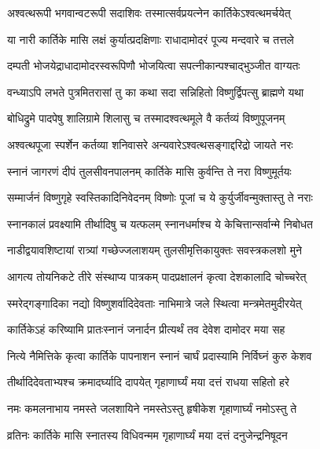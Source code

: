 \twolineshloka
{अश्वत्थरूपी भगवान्वटरूपी सदाशिवः}
{तस्मात्सर्वप्रयत्नेन कार्तिकेऽश्वत्थमर्चयेत्} %

\twolineshloka
{या नारी कार्तिके मासि लक्षं कुर्यात्प्रदक्षिणाः}
{राधादामोदरं पूज्य मन्दवारे च तत्तले} %

\twolineshloka
{दम्पती भोजयेद्राधादामोदरस्वरूपिणौ}
{भोजयित्वा सपत्नीकान्पश्चाद्भुञ्जीत वाग्यतः} %

\twolineshloka
{वन्ध्याऽपि लभते पुत्रमितरासां तु का कथा}
{सदा सन्निहितो विष्णुर्द्विपत्सु ब्राह्मणे यथा} %

\twolineshloka
{बोधिद्रुमे पादपेषु शालिग्रामे शिलासु च}
{तस्मादश्वत्थमूले वै कर्तव्यं विष्णुपूजनम्} %

\twolineshloka
{अश्वत्थपूजा स्पर्शेन कर्तव्या शनिवासरे}
{अन्यवारेऽश्वत्थसङ्गाद्दरिद्रो जायते नरः} %

\twolineshloka
{स्नानं जागरणं दीपं तुलसीवनपालनम्}
{कार्तिके मासि कुर्वन्ति ते नरा विष्णुमूर्तयः} %

\twolineshloka
{सम्मार्जनं विष्णुगृहे स्वस्तिकादिनिवेदनम्}
{विष्णोः पूजां च ये कुर्युर्जीवन्मुक्तास्तु ते नराः} %

\twolineshloka
{स्नानकालं प्रवक्ष्यामि तीर्थादिषु च यत्फलम्}
{स्नानधर्माश्च ये केचित्तान्सर्वान्मे निबोधत} %






\twolineshloka
{नाडीद्वयावशिष्टायां रात्र्यां गच्छेज्जलाशयम्}
{तुलसीमृत्तिकायुक्तः सवस्त्रकलशो मुने} %

\twolineshloka
{आगत्य तोयनिकटे तीरे संस्थाप्य पात्रकम्}
{पादप्रक्षालनं कृत्वा देशकालादि चोच्चरेत्} %

\twolineshloka
{स्मरेद्गङ्गादिका नद्यो विष्णुशर्वादिदेवताः}
{नाभिमात्रे जले स्थित्वा मन्त्रमेतमुदीरयेत्} %

\twolineshloka
{कार्तिकेऽहं करिष्यामि प्रातःस्नानं जनार्दन}
{प्रीत्यर्थं तव देवेश दामोदर मया सह} %

\twolineshloka
{नित्ये नैमित्तिके कृत्वा कार्तिके पापनाशन}
{स्नानं चार्घं प्रदास्यामि निर्विघ्नं कुरु केशव} %

\twolineshloka
{तीर्थादिदेवताभ्यश्च क्रमादर्घ्यादि दापयेत्}
{गृहाणार्घ्यं मया दत्तं राधया सहितो हरे} %

\twolineshloka
{नमः कमलनाभाय नमस्ते जलशायिने}
{नमस्तेऽस्तु हृषीकेश गृहाणार्घ्यं नमोऽस्तु ते} %

\twolineshloka
{व्रतिनः कार्तिके मासि स्नातस्य विधिवन्मम}
{गृहाणार्घ्यं मया दत्तं दनुजेन्द्रनिषूदन} %

